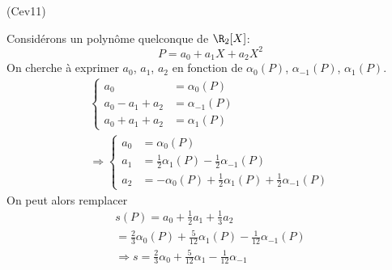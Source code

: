 \begin{tiny}(Cev11)\end{tiny} Considérons un polynôme quelconque de $\R_2[X]$:
\begin{displaymath}
  P =a_0 + a_1 X +a_2 X^2
\end{displaymath}
On cherche à exprimer $a_0$, $a_1$, $a_2$ en fonction de $\alpha_0(P)$, $\alpha_{-1}(P)$, $\alpha_{1}(P)$.
\begin{multline*}
\left\lbrace  
\begin{aligned}
  a_0 &= \alpha_0(P)\\
  a_0 - a_1 + a_2 &= \alpha_{-1}(P)\\
  a_0 + a_1 + a_2 &= \alpha_{1}(P)
\end{aligned}
\right. \\
\Rightarrow
\left\lbrace 
\begin{aligned}
  a_0 &= \alpha_0(P)\\
  a_1 &= \frac{1}{2}\alpha_1(P)-\frac{1}{2}\alpha_{-1}(P)\\
  a_2 &= -\alpha_0(P) + \frac{1}{2}\alpha_1(P)+\frac{1}{2}\alpha_{-1}(P)
\end{aligned}
\right. 
\end{multline*}
On peut alors remplacer
\begin{multline*}
  s(P) = a_0 + \frac{1}{2}a_1+\frac{1}{3}a_2 \\
  = \frac{2}{3}\alpha_0(P) + \frac{5}{12}\alpha_{1}(P) - \frac{1}{12}\alpha_{-1}(P) \\
\Rightarrow
s  = \frac{2}{3}\alpha_0 + \frac{5}{12}\alpha_{1} - \frac{1}{12}\alpha_{-1}
\end{multline*}

